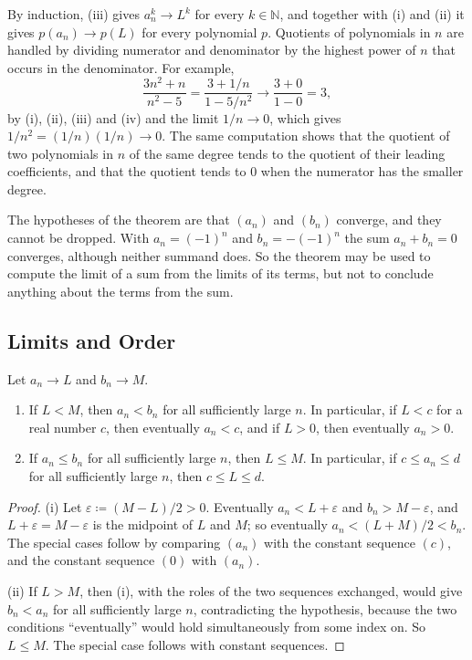 By induction, (iii) gives $a_n^k\to L^k$ for every $k\in\mathbb N$, and together with (i) and (ii) it gives $p(a_n)\to p(L)$ for every polynomial $p$. Quotients of polynomials in $n$ are handled by dividing numerator and denominator by the highest power of $n$ that occurs in the denominator. For example,
\[
\frac{3n^2+n}{n^2-5}=\frac{3+1/n}{1-5/n^2}\to\frac{3+0}{1-0}=3 ,
\]
by (i), (ii), (iii) and (iv) and the limit $1/n\to0$, which gives $1/n^2=(1/n)(1/n)\to0$. The same computation shows that the quotient of two polynomials in $n$ of the same degree tends to the quotient of their leading coefficients, and that the quotient tends to $0$ when the numerator has the smaller degree.

The hypotheses of the theorem are that $(a_n)$ and $(b_n)$ converge, and they cannot be dropped. With $a_n=(-1)^n$ and $b_n=-(-1)^n$ the sum $a_n+b_n=0$ converges, although neither summand does. So the theorem may be used to compute the limit of a sum from the limits of its terms, but not to conclude anything about the terms from the sum.

\subsection{Limits and Order}

\begin{proposition}
\label{prop:limit-order}
Let $a_n\to L$ and $b_n\to M$.
\begin{enumerate}
\item If $L<M$, then $a_n<b_n$ for all sufficiently large $n$. In particular, if $L<c$ for a real number $c$, then eventually $a_n<c$, and if $L>0$, then eventually $a_n>0$.
\item If $a_n\le b_n$ for all sufficiently large $n$, then $L\le M$. In particular, if $c\le a_n\le d$ for all sufficiently large $n$, then $c\le L\le d$.
\end{enumerate}
\end{proposition}

\begin{proof}
(i) Let $\varepsilon\coloneqq(M-L)/2>0$. Eventually $a_n<L+\varepsilon$ and $b_n>M-\varepsilon$, and $L+\varepsilon=M-\varepsilon$ is the midpoint of $L$ and $M$; so eventually $a_n<(L+M)/2<b_n$. The special cases follow by comparing $(a_n)$ with the constant sequence $(c)$, and the constant sequence $(0)$ with $(a_n)$.

(ii) If $L>M$, then (i), with the roles of the two sequences exchanged, would give $b_n<a_n$ for all sufficiently large $n$, contradicting the hypothesis, because the two conditions ``eventually'' would hold simultaneously from some index on. So $L\le M$. The special case follows with constant sequences.
\end{proof}

